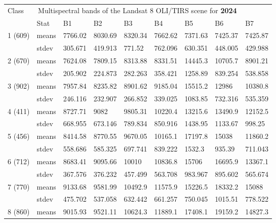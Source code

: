 \documentclass[jmse,article,submit,pdftex,moreauthors]{Definitions/mdpi}
\begin{document}
\begin{table}[H]
  \centering
  \begin{tabularx}{\linewidth}{p{1.3cm}p{1.0cm}p{1.0cm}p{1.0cm}p{1.0cm}p{1.0cm}p{1.0cm}p{1.0cm}p{1.0cm}}
  \toprule
  \multirow{2}{*}{Class} & \multicolumn{7}{c}{Multispectral bands of the Landsat 8 OLI/TIRS scene for \textbf{2024}} \\
    & Stat & B1 & B2 & B3 & B4 & B5 & B6 & B7 \\
    \midrule
    \multirow{2}{*}{1 (609)} & means & 7766.02 & 8030.69 & 8320.34 & 7662.62 & 7371.63 & 7425.37 & 7425.87 \\
    & stdev & 305.671 & 419.913 & 771.52 & 762.096 & 630.351 & 448.005 & 429.988 \\
    \midrule
    \multirow{2}{*}{2 (670)} & means & 7624.08 & 7809.15 & 8313.88 & 8331.51 & 14445.3 & 10705.7 & 8901.21 \\
    & stdev & 205.902 & 224.873 & 282.263 & 358.421 & 1258.89 & 839.254 & 538.858 \\
    \midrule
    \multirow{2}{*}{3 (902)} & means & 7957.84 & 8235.82 & 8901.62 & 9185.04 & 15515.2 & 12986 & 10380.8 \\
    & stdev & 246.116 & 232.907 & 266.852 & 339.025 & 1083.85 & 732.316 & 535.359 \\
    \midrule
    \multirow{2}{*}{4 (411)} & means & 8727.71 & 9082 & 9805.31 & 10220.4 & 13215.6 & 13490.9 & 12152.5 \\
    & stdev & 668.955 & 673.146 & 789.834 & 850.916 & 1438.95 & 1133.67 & 998.25 \\
    \midrule
    \multirow{2}{*}{5 (456)} & means & 8414.58 & 8770.55 & 9670.05 & 10165.1 & 17197.8 & 15038 & 11860.2 \\
    & stdev & 558.686 & 585.325 & 697.741 & 839.222 &1532.3 & 935.39 & 711.043 \\
    \midrule
    \multirow{2}{*}{6 (712)} & means & 8683.41 & 9095.66 & 10010 & 10836.8 & 15706 & 16695.9 & 13367.1 \\
    & stdev & 367.576 & 376.232 & 457.499 & 563.708 & 983.967 & 895.602 & 565.674 \\
    \midrule
    \multirow{2}{*}{7 (770)} & means & 9133.68 & 9581.99 & 10492.9 & 11575.9 & 15226.5 & 18332.2 & 15088 \\
    & stdev & 475.702 & 537.058 & 632.442 & 661.257 & 750.045 & 1015.51 & 778.522 \\
    \midrule
    \multirow{2}{*}{8 (860)} & means & 9015.93 & 9521.11 & 10624.3 & 11889.1 & 17408.1 & 19159.2 & 14827.3 \\

\end{tabularx}
\end{table}
\end{document}
